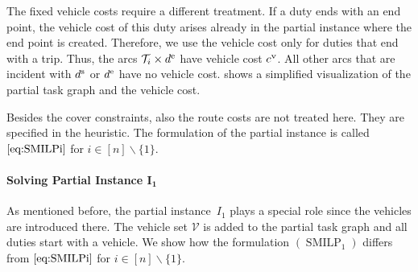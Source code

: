 The fixed vehicle costs require a different treatment. If a duty ends with an end point, the vehicle cost of this duty arises already in the partial instance where the end point is created. Therefore, we use the vehicle cost only for duties that end with a trip. Thus, the arcs ${\mathcal{T}_i\times d^{\operatorname{e}}}$ have vehicle cost $c^{\operatorname{v}}$. All other arcs that are incident with $d^{\operatorname{s}}$ or $d^{\operatorname{e}}$ have no vehicle cost.  shows a simplified visualization of the partial task graph and the vehicle cost.

Besides the cover constraints, also the route costs are not treated here. They are specified in the heuristic. The formulation of the partial instance is called $\eqref{eq:SMILPi}$ for ${i\in[n]\backslash\{1\}}$.

\paragraph{Solving Partial Instance $\boldsymbol{I_1}$} \parfill

As mentioned before, the partial instance~$I_1$ plays a special role since the vehicles are introduced there. The vehicle set $\mathcal{V}$ is added to the partial task graph and all duties start with a vehicle. We show how the formulation $(\operatorname{SMILP}_1)$ differs from $\eqref{eq:SMILPi}$ for ${i\in[n]\backslash\{1\}}$.

\newpage

